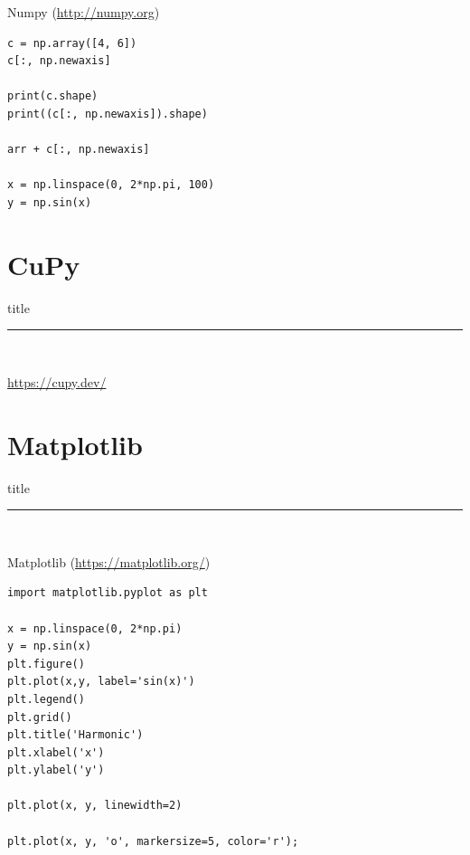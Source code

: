 \documentclass{beamer}
\begin{document}
\begin{frame}[fragile]{Numpy (\url{http://numpy.org}) }
\begin{lstlisting}
c = np.array([4, 6])
c[:, np.newaxis]

print(c.shape)
print((c[:, np.newaxis]).shape)

arr + c[:, np.newaxis]

x = np.linspace(0, 2*np.pi, 100)
y = np.sin(x)
\end{lstlisting}

\end{frame}


\section{CuPy}
\begin{frame}[plain]
  \vfill
  \centering
  \begin{beamercolorbox}[sep=8pt,center,shadow=true,rounded=true]{title}
    \par%
    \color{oxfordblue}\noindent\rule{10cm}{1pt} \\
  \end{beamercolorbox}
  \url{https://cupy.dev/}
  \vfill
\end{frame}


\section{Matplotlib }
\begin{frame}[plain]
  \vfill
  \centering
  \begin{beamercolorbox}[sep=8pt,center,shadow=true,rounded=true]{title}
    \par%
    \color{oxfordblue}\noindent\rule{10cm}{1pt} \\
  \end{beamercolorbox}
  \vfill
\end{frame}

\begin{frame}[fragile]{Matplotlib (\url{https://matplotlib.org/})}
\begin{lstlisting}
import matplotlib.pyplot as plt

x = np.linspace(0, 2*np.pi)
y = np.sin(x)
plt.figure()
plt.plot(x,y, label='sin(x)')
plt.legend()
plt.grid()
plt.title('Harmonic')
plt.xlabel('x')
plt.ylabel('y')

plt.plot(x, y, linewidth=2)

plt.plot(x, y, 'o', markersize=5, color='r');
\end{lstlisting}
\end{frame}
\end{document}
